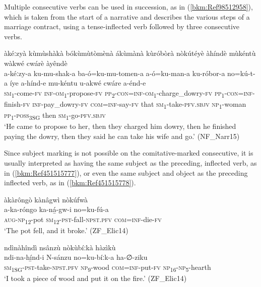 Multiple consecutive verbs can be used in succession, as in (\ref{bkm:Ref98512958}), which is taken from the start of a narrative and describes the various steps of a marriage contract, using a tense-inflected verb followed by three consecutive verbs.

\ea
\label{bkm:Ref98512958}
àkéːzyà kùmùshàkà bókùmùtòmènà ákùmànà kùróbòrà nòkútéyè àhíndè mùkéntù wàkwé cwárè àyêndè\\
\gll a-kéːzy-a    ku-mu-shak-a    ba-ó=ku-mu-tomen-a a-ó=ku-man-a    ku-róbor-a    no=kú-t-a    íye a-hínd-e    mu-kéntu  u-akwé  cwáre  a-énd-e\\
\textsc{sm}\textsubscript{1}-come-\textsc{fv}  \textsc{inf}-\textsc{om}\textsubscript{1}-propose-\textsc{fv}  \textsc{pp}\textsubscript{2}-\textsc{con}=\textsc{inf}-\textsc{om}\textsubscript{1}-charge\_dowry-\textsc{fv}
\textsc{pp}\textsubscript{1}-\textsc{con}=\textsc{inf}-finish-\textsc{fv}  \textsc{inf}-pay\_dowry-\textsc{fv}  \textsc{com}=\textsc{inf}-say-\textsc{fv}  that
\textsc{sm}\textsubscript{1}-take-\textsc{pfv}.\textsc{sbjv}  \textsc{np}\textsubscript{1}-woman  \textsc{pp}\textsubscript{1}-\textsc{poss}\textsubscript{3SG}  then  \textsc{sm}\textsubscript{1}-go-\textsc{pfv}.\textsc{sbjv}\\
\glt ‘He came to propose to her, then they charged him dowry, then he finished paying the dowry, then they said he can take his wife and go.’ (NF\_Narr15)
\z

Since subject marking is not possible on the comitative-marked consecutive, it is usually interpreted as having the same subject as the preceding, inflected verb, as in (\ref{bkm:Ref451515777}), or even the same subject and object as the preceding inflected verb, as in (\ref{bkm:Ref451515778}).

\ea
\label{bkm:Ref451515777}
àkàrôngò kànâgwì nòkúfwà\\
\gll a-ka-róngo    ka-ná̲-gw-i      no=ku-fú-a\\
\textsc{aug}-\textsc{np}\textsubscript{12}-pot  \textsc{sm}\textsubscript{12}-\textsc{pst}-fall-\textsc{npst}.\textsc{pfv}  \textsc{com}=\textsc{inf}-die-\textsc{fv}\\
\glt ‘The pot fell, and it broke.’ (ZF\_Elic14)
\z

\ea
\label{bkm:Ref451515778}
ndìnàhîndì nsânzù nòkùbíːkà hàzìkù\\
\gll ndi-na-hí̲nd-i    N-sánzu  no=ku-bíːk-a    ha-∅-ziku\\
\textsc{sm}\textsubscript{1SG}-\textsc{pst}-take-\textsc{npst}.\textsc{pfv}  \textsc{np}\textsubscript{9}-wood  \textsc{com}=\textsc{inf}-put-\textsc{fv}  \textsc{np}\textsubscript{16}-\textsc{np}\textsubscript{5}-hearth\\
\glt ‘I took a piece of wood and put it on the fire.’ (ZF\_Elic14)
\z


